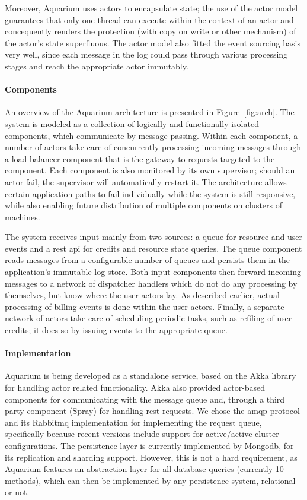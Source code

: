 Moreover, Aquarium uses actors to encapsulate state; the use of the actor
model guarantees that only one thread can execute within the context
of an actor and concequently renders the protection (with copy on
write or other mechanism) of the actor's state superfluous. The actor
model also fitted the event sourcing basis very well, since each
message in the log could pass through various processing stages and
reach the appropriate actor immutably.

\paragraph{Components} An overview of the Aquarium architecture is
presented in Figure~\ref{fig:arch}. The system is modeled as a
collection of logically and functionally isolated components, which
communicate by message passing. Within each component, a number of
actors take care of concurrently processing incoming messages through
a load balancer component that is the gateway to requests targeted to
the component. Each component is also monitored by its own supervisor;
should an actor fail, the supervisor will automatically restart it.
The architecture allows certain application paths to fail individually
while the system is still responsive, while also enabling future
distribution of multiple components on clusters of machines.

The system receives input mainly from two sources: a queue for
resource and user events and a {\sc rest api} for credits and resource
state queries. The queue component reads messages from a configurable
number of queues and persists them in the application's immutable log
store. Both input components then forward incoming messages to a
network of dispatcher handlers which do not do any processing by
themselves, but know where the user actors lay. As described earlier,
actual processing of billing events is done within the user actors.
Finally, a separate network of actors take care of scheduling periodic
tasks, such as refiling of user credits; it does so by issuing events
to the appropriate queue.

\paragraph{Implementation}

Aquarium is being developed as a standalone service, based on the Akka library
for handling actor related functionality. Akka also provided actor-based
components for communicating with the message queue and, through a third party
component (Spray) for handling {\sc rest} requests. We chose the {\sc amqp}
protocol and its Rabbit{\sc mq} implementation for implementing the request
queue, specifically because recent versions include support for active/active
cluster configurations. The persistence layer is currently implemented by
Mongo{\sc db}, for its replication and sharding support. However, this is not a
hard requirement, as Aquarium features an abstraction layer for all database
queries (currently 10 methods), which can then be implemented by any
persistence system, relational or not.
